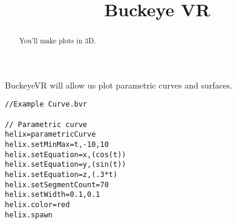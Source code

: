 \documentclass{ximera}
\title{Buckeye VR}
\begin{document}
\begin{abstract}
  You'll make plots in 3D.
\end{abstract}
\maketitle

BuckeyeVR will allow us plot parametric curves and surfaces.


\begin{verbatim}
//Example Curve.bvr

// Parametric curve
helix=parametricCurve
helix.setMinMax=t,-10,10
helix.setEquation=x,(cos(t))
helix.setEquation=y,(sin(t))
helix.setEquation=z,(.3*t)
helix.setSegmentCount=70
helix.setWidth=0.1,0.1
helix.color=red
helix.spawn
\end{verbatim}

\end{document}
